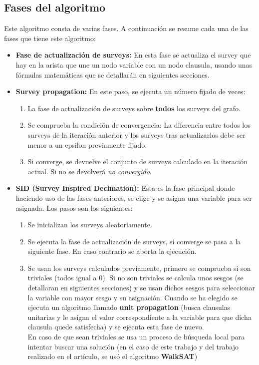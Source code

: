 \subsection{Fases del algoritmo}
\label{fases_alg}
Este algoritmo consta de varias fases.
A continuación se resume cada una de las fases que tiene este algoritmo:
\begin{itemize}
	\item \textbf{Fase de actualización de surveys:} En esta fase se actualiza el survey que hay en la arista que une un nodo variable con un nodo clausula, usando unas fórmulas matemáticas que se detallarán en siguientes secciones.
	\item \textbf{Survey propagation:} En este paso, se ejecuta un  número fijado de veces:
	\begin{enumerate}
		\item La fase de actualización de surveys sobre \textbf{todos} los surveys del grafo.
		\item Se comprueba la condición de convergencia: La diferencia entre todos los surveys de la iteración anterior y los surveys tras actualizarlos debe ser menor a un epsilon previamente fijado.  
		\item Si converge, se devuelve el conjunto de surveys calculado en la iteración actual. Si no se devolverá \textit{no convergido}. 
	\end{enumerate} 
	\item \textbf{SID (Survey Inspired Decimation):} Esta es la fase principal donde haciendo uso de las fases anteriores, se elige y se asigna una variable para ser asignada. Los pasos son los siguientes:
	\begin{enumerate}[1º]
		\item Se inicializan los surveys aleatoriamente.
		\item Se ejecuta la fase de actualización de surveys, si converge se pasa a la siguiente fase. En caso contrario se aborta la ejecución.
		\item Se usan los surveys calculados previamente, primero se comprueba si son triviales (todos igual a 0). Si no son triviales se calcula unos sesgos (se detallaran en siguientes secciones) y se usan dichos sesgos para seleccionar la variable con mayor sesgo y su asignación. Cuando se ha elegido se ejecuta un algoritmo llamado \textbf{unit propagation} (busca clausulas unitarias y le asigna el valor correspondiente a la variable para que dicha clausula quede satisfecha) y se ejecuta esta fase de nuevo.\\
		En caso de que sean triviales se usa un proceso de búsqueda local para intentar buscar una solución (en el caso de este trabajo y del trabajo realizado en el artículo, se usó el algoritmo \textbf{WalkSAT})
	\end{enumerate}
\end{itemize}
